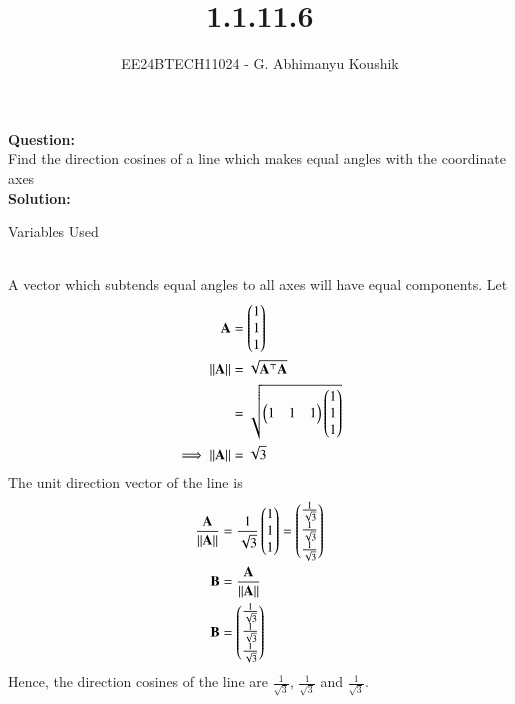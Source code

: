 \documentclass[journal]{IEEEtran}
\begin{document}

\vspace{3cm}

\title{1.1.11.6}
\author{EE24BTECH11024 - G. Abhimanyu Koushik
}
{\let\newpage\relax\maketitle}

\renewcommand{\thefigure}{\theenumi}
\renewcommand{\thetable}{\theenumi}
\setlength{\intextsep}{10pt} %

\textbf{Question:}\\
Find the direction cosines of a line which makes equal angles with the coordinate axes
\\
\textbf{Solution:}
\begin{table}[h!]    
  \centering
  
  \caption{Variables Used}
  \label{tab10.5.3.9.1}
\end{table}\\
A vector which subtends equal angles to all axes will have equal components. Let 
\begin{align}
	\mathbf{A} &= \begin{pmatrix}1\\1\\1\end{pmatrix}\\
	\left\lVert\mathbf{A}\right\rVert &= \sqrt{\mathbf{A}^\top\mathbf{A}}\\
		     &= \sqrt{\begin{pmatrix}1 & 1 & 1\end{pmatrix}\begin{pmatrix}1\\1\\1\end{pmatrix}}\\
	\implies \left\lVert\mathbf{A}\right\rVert &= \sqrt{3}
\end{align}
The unit direction vector of the line is
\begin{align}
	\frac{\mathbf{A}}{\left\lVert\mathbf{A}\right\rVert} &= \frac{1}{\sqrt{3}}\begin{pmatrix}1\\1\\1\end{pmatrix} = \begin{pmatrix}\frac{1}{\sqrt{3}}\\\frac{1}{\sqrt{3}}\\\frac{1}{\sqrt{3}}\end{pmatrix}\\
	\mathbf{B} &= \frac{\mathbf{A}}{\left\lVert\mathbf{A}\right\rVert}\\
	\mathbf{B} &= \begin{pmatrix}\frac{1}{\sqrt{3}}\\\frac{1}{\sqrt{3}}\\\frac{1}{\sqrt{3}}\end{pmatrix}
\end{align}
Hence, the direction cosines of the line are $\frac{1}{\sqrt{3}}$, $\frac{1}{\sqrt{3}}$ and $\frac{1}{\sqrt{3}}$.
\end{document}

